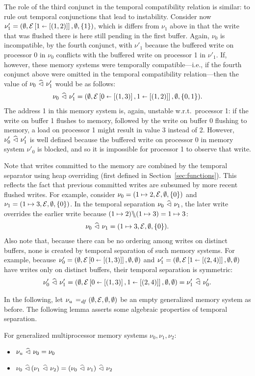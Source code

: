 \documentclass[11pt]{report}
\begin{document}
The role of the third conjunct in the temporal compatibility relation is similar: to rule out temporal conjunctions that lead to instability. Consider now $\nu'_1 = (\operatorname{\emptyset},\mathcal{E} \left[ 1 \shortleftarrow \left[(1,2)\right] \right], \operatorname{\emptyset}, \left\lbrace 1 \right\rbrace)$, which is differs from $\nu_1$ above in that the write that was flushed there is here still pending in the first buffer. Again, $\nu_0$ is incompatible, by the fourth conjunct, with $\nu'_1$ because the buffered write on processor 0 in $\nu_0$ conflicts with the buffered write on processor 1 in $\nu'_1$. If, however, these memory systems were temporally compatible---i.e., if the fourth conjunct above were omitted in the temporal compatibility relation---then the value of $\nu_0 \operatorname{\,\widehat{\vartriangleleft}\,} \nu'_1$ would be as follows: \[ \nu_0 \operatorname{\,\widehat{\vartriangleleft}\,} \nu'_1 = (\operatorname{\emptyset}, \mathcal{E} \left[ 0 \shortleftarrow \left[(1,3)\right], 1 \shortleftarrow \left[(1,2)\right] \right], \operatorname{\emptyset}, \left\lbrace 0,1 \right\rbrace).\] The address 1 in this memory system is, again, unstable w.r.t.\ processor 1: if the write on buffer 1 flushes to memory, followed by the write on buffer 0 flushing to memory, a load on processor 1 might result in value 3 instead of 2. However, $\nu'_0 \operatorname{\,\widehat{\vartriangleleft}\,} \nu'_1$ is well defined because the buffered write on processor 0 in memory system $\nu'_0$ is blocked, and so it is impossible for processor 1 to observe that write. 

Note that writes committed to the memory are combined by the temporal separator using heap overriding (first defined in Section~\ref{sec:functions}). This reflects the fact that previous committed writes are subsumed by more recent flushed writes. For example, consider $\nu_0 = (1 \mapsto 2,\mathcal{E},\operatorname{\emptyset},\left\lbrace 0 \right\rbrace)$ and $\nu_1 = (1 \mapsto 3, \mathcal{E}, \operatorname{\emptyset}, \left\lbrace 0 \right\rbrace)$. In the temporal separation $\nu_0 \operatorname{\,\widehat{\vartriangleleft}\,} \nu_1$, the later write overrides the earlier write because $(1 \mapsto 2) \backslash\!\!\backslash (1\mapsto 3) = 1 \mapsto 3$: \[ \nu_0 \operatorname{\,\widehat{\vartriangleleft}\,} \nu_1 = (1 \mapsto 3, \mathcal{E}, \operatorname{\emptyset}, \left\lbrace 0 \right\rbrace).\] Also note that, because there can be no ordering among writes on distinct buffers, none is created by temporal separation of such memory systems. For example, because $\nu'_0 = (\operatorname{\emptyset},\mathcal{E} \left[ 0 \shortleftarrow \left[(1,3)\right] \right],\operatorname{\emptyset},\operatorname{\emptyset})$ and $\nu'_1 = (\operatorname{\emptyset},\mathcal{E} \left[ 1 \shortleftarrow \left[(2,4)\right] \right],\operatorname{\emptyset},\operatorname{\emptyset})$ have writes only on distinct buffers, their temporal separation is symmetric: \[ \nu'_0 \operatorname{\,\widehat{\vartriangleleft}\,} \nu'_1 = (\operatorname{\emptyset},\mathcal{E} \left[ 0 \shortleftarrow \left[(1,3)\right],1 \shortleftarrow \left[(2,4)\right] \right],\operatorname{\emptyset},\operatorname{\emptyset}) = \nu'_1 \operatorname{\,\widehat{\vartriangleleft}\,} \nu'_0.\]

In the following, let $\nu_u \operatorname{\;=_{\mathit{df}}\;} (\operatorname{\emptyset}, \mathcal{E}, \operatorname{\emptyset}, \operatorname{\emptyset})$ be an empty generalized memory system as before. The following lemma asserts some algebraic properties of temporal separation. \begin{lemma}
  \label{lem:temporal-separation-algebra}
  For generalized multiprocessor memory systems $\nu_0, \nu_1, \nu_2$: 
  \begin{itemize}
    \item $\nu_u \operatorname{\,\widehat{\vartriangleleft}\,} \nu_0 = \nu_0$
    \item $\nu_0 \operatorname{\,\widehat{\vartriangleleft}\,} (\nu_1 \operatorname{\,\widehat{\vartriangleleft}\,} \nu_2) = (\nu_0 \operatorname{\,\widehat{\vartriangleleft}\,} \nu_1) \operatorname{\,\widehat{\vartriangleleft}\,} \nu_2$
  \end{itemize}
\end{lemma}
\end{document}
